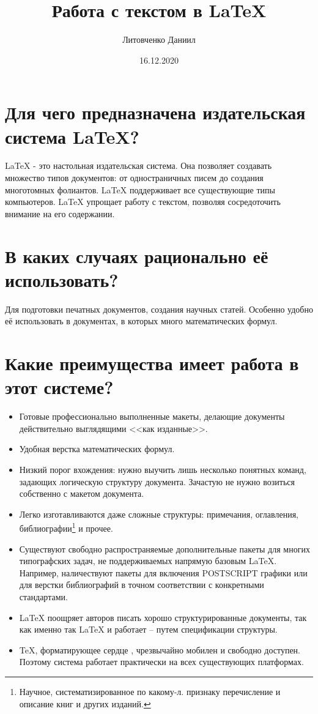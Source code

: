 \documentclass[a4paper,12pt]{article} %
\author{Литовченко Даниил}
\title{Работа с текстом в \LaTeX{}}
\date{16.12.2020}
\begin{document}

\maketitle
\newpage
\section{Для чего предназначена издательская система \LaTeX{}?}
\begin{flushright}
\LaTeX{} - это настольная издательская система. Она позволяет создавать множество типов документов: от  одностраничных писем до создания многотомных фолиантов.  \LaTeX{} поддерживает все существующие типы компьютеров. \LaTeX{} упрощает работу с текстом, позволяя сосредоточить внимание на его содержании.
\end{flushright}

\section{В каких случаях рационально её использовать?}
\begin{center}
Для подготовки печатных документов, создания научных статей. Особенно удобно её использовать в документах, в которых много математических формул.
\end{center}

\section{Какие преимущества имеет работа в этот системе?}
\begin{flushleft}
\begin{itemize}
\item Готовые профессионально выполненные макеты, делающие документы действительно выглядящими <<как изданные>>.
\item Удобная верстка математических формул.
\item Низкий порог вхождения: нужно выучить лишь несколько понятных команд, задающих логическую структуру документа. Зачастую не нужно возиться собственно с макетом документа.
\item Легко изготавливаются даже сложные структуры: примечания, оглавления, библиографии\footnote{Научное, систематизированное по какому-л. признаку перечисление и описание книг и других изданий.} и прочее.
\item Существуют свободно распространяемые дополнительные пакеты для многих типографских задач, не поддерживаемых напрямую базовым \LaTeX{}. Например, наличествуют пакеты для включения POSTSCRIPT графики или для верстки библиографий в точном соответствии с конкретными стандартами.
\item \LaTeX{} поощряет авторов писать хорошо структурированные документы, так как именно так \LaTeX{} и работает -- путем спецификации структуры.
\item \TeX{}, форматирующее сердце \LaTeXe{}, чрезвычайно мобилен и свободно доступен. Поэтому система работает практически на всех существующих платформах.
\end{itemize}
\end{flushleft}
\end{document}
